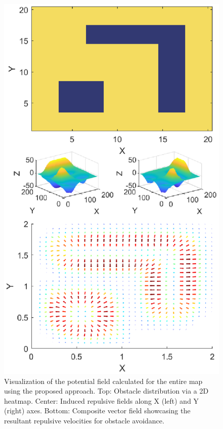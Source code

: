 \documentclass[letterpaper, 10 pt, conference]{ieeeconf}  %
\begin{document}
\begin{figure}
	\centering
	\includegraphics[width=1\linewidth]{demo-field1c.eps} %
	\caption{Visualization of the potential field calculated for the entire map using the proposed approach. Top: Obstacle distribution via a 2D heatmap. Center: Induced repulsive fields along X (left) and Y (right) axes. Bottom: Composite vector field showcasing the resultant repulsive velocities for obstacle avoidance.}
	\label{fig:example-field}
\end{figure}
%
%
%
\end{document}
